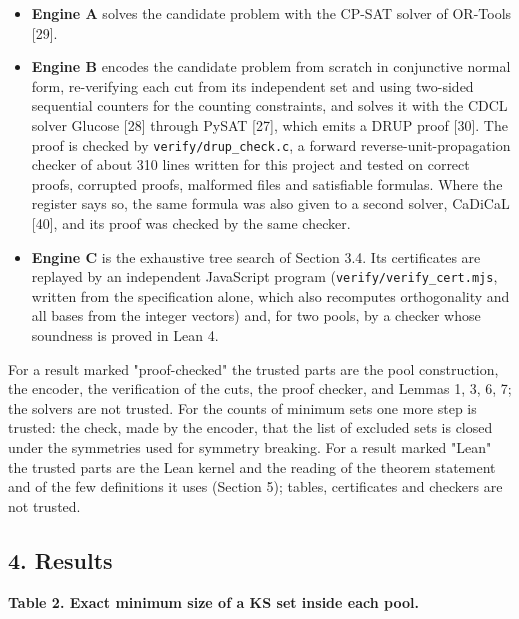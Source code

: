\documentclass[11pt,a4paper]{article}
\providecommand{\tightlist}{\setlength{\itemsep}{0pt}\setlength{\parskip}{0pt}}
\begin{document}
\begin{itemize}
\tightlist
\item
  \textbf{Engine A} solves the candidate problem with the CP-SAT solver of OR-Tools {[}29{]}.
\item
  \textbf{Engine B} encodes the candidate problem from scratch in conjunctive normal form, re-verifying
  each cut from its independent set and using two-sided sequential counters for the counting
  constraints, and solves it with the CDCL solver Glucose {[}28{]} through PySAT {[}27{]}, which emits a DRUP
  proof {[}30{]}. The proof is checked by \texttt{verify/drup\_check.c}, a forward reverse-unit-propagation checker
  of about 310 lines written for this project and tested on correct proofs, corrupted proofs,
  malformed files and satisfiable formulas. Where the register says so, the same formula was also
  given to a second solver, CaDiCaL {[}40{]}, and its proof was checked by the same checker.
\item
  \textbf{Engine C} is the exhaustive tree search of Section 3.4. Its certificates are replayed by an
  independent JavaScript program (\texttt{verify/verify\_cert.mjs}, written from the specification alone,
  which also recomputes orthogonality and all bases from the integer vectors) and, for two pools, by a
  checker whose soundness is proved in Lean 4.
\end{itemize}

For a result marked "proof-checked" the trusted parts are the pool construction, the encoder, the
verification of the cuts, the proof checker, and Lemmas 1, 3, 6, 7; the solvers are not trusted. For
the counts of minimum sets one more step is trusted: the check, made by the encoder, that the list of
excluded sets is closed under the symmetries used for symmetry breaking. For a
result marked "Lean" the trusted parts are the Lean kernel and the reading of the theorem statement
and of the few definitions it uses (Section 5); tables, certificates and checkers are not trusted.

\subsection{4. Results}\label{4-results}

\textbf{Table 2. Exact minimum size of a KS set inside each pool.}
\end{document}
